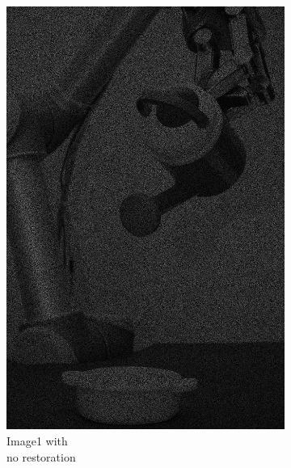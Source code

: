 \begin{figure}[H]
    \centering
    \begin{subfigure}[b]{0.27\textwidth}
        \includegraphics[width=\textwidth]{img1/Image1.png}
        \caption{Image1 with \\no restoration}
        \label{fig:img1_src}
    \end{subfigure}
    \begin{subfigure}[b]{0.27\textwidth}

\end{subfigure}
\end{figure}
